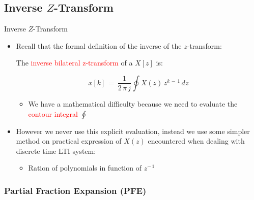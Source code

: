 \documentclass{beamer}
\begin{document}
\subsection{Inverse $Z$-Transform}

\begin{frame}[t]{Inverse $Z$-Transform}

\begin{itemize}

\item Recall that the formal definition of the inverse of the $z$-transform:

\begin{definition}

The \textcolor{red}{inverse bilateral z-transform} of a $X[z]$ is:

\begin{equation}
x[k] \, = \, \displaystyle\frac{1}{2 \, \pi \, j} \displaystyle\oint X(z) \, z^{k \, - \, 1} \, dz
\end{equation}

\end{definition}


	\begin{itemize}
	\item We have a mathematical difficulty because we need to evaluate the \textcolor{red}{contour integral} $\displaystyle\oint$
	\end{itemize}


\item However we never use this explicit evaluation, instead we use some simpler method on practical expression of $X(z)$ encountered when dealing with discrete time LTI system:

	\begin{itemize}
	\item Ration of polynomials in function of $z^{- \, 1}$
	\end{itemize}

\end{itemize}

\end{frame}


\subsubsection{Partial Fraction Expansion (PFE)}
\end{document}

